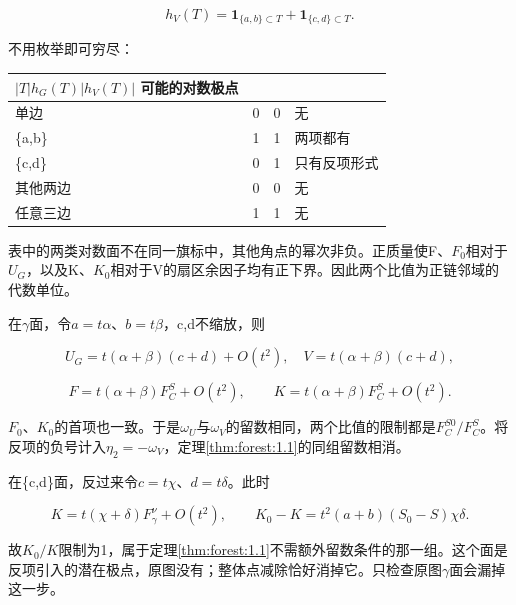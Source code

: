 \documentclass[11pt,a4paper,oneside]{ctexrep}
\theoremstyle{cnplain}
\theoremstyle{definition}
\theoremstyle{remark}
\begin{document}
\begin{equation}
h_V(T)=\mathbf1_{\{a,b\}\subset T}+\mathbf1_{\{c,d\}\subset T}.
\end{equation}

不用枚举即可穷尽：

{\def\LTcaptype{none} %
\begin{longtable}[]{@{}lrrl@{}}
\toprule\noalign{}
\(| T | h_G(T) | h_V(T) |\) 可能的对数极点 & & & \\
\midrule\noalign{}
\endhead
\bottomrule\noalign{}
\endlastfoot
单边 & 0 & 0 & 无 \\
\{a,b\} & 1 & 1 & 两项都有 \\
\{c,d\} & 0 & 1 & 只有反项形式 \\
其他两边 & 0 & 0 & 无 \\
任意三边 & 1 & 1 & 无 \\
\end{longtable}
}

表中的两类对数面不在同一旗标中，其他角点的幂次非负。正质量使F、\(F_0\)相对于\(U_G\)，以及K、\(K_0\)相对于V的扇区余因子均有正下界。因此两个比值为正链邻域的代数单位。

在\(\gamma \)面，令\(a=t\alpha \)、\(b=t\beta \)，c,d不缩放，则

\begin{equation}
U_G=t(\alpha+\beta)(c+d)+O(t^2),\quad
 V=t(\alpha+\beta)(c+d),
\end{equation}

\begin{equation}
F=t(\alpha+\beta)F_C^S+O(t^2),\qquad
 K=t(\alpha+\beta)F_C^S+O(t^2).                                 \label{eq:forest:15}
\end{equation}

\(F_0\)、\(K_0\)的首项也一致。于是\(\omega _U\)与\(\omega _V\)的留数相同，两个比值的限制都是\(F_C^{S0}/F_C^S\)。将反项的负号计入\(\eta _2=- \omega _V\)，定理\ref{thm:forest:1.1}的同组留数相消。

在\{c,d\}面，反过来令\(c=t\chi \)、\(d=t\delta \)。此时

\begin{equation}
K=t(\chi+\delta)F_\gamma^\nu+O(t^2),\qquad
 K_0-K=t^2(a+b)(S_0-S)\chi\delta.                              \label{eq:forest:16}
\end{equation}

故\(K_0/K\)限制为1，属于定理\ref{thm:forest:1.1}不需额外留数条件的那一组。这个面是反项引入的潜在极点，原图没有；整体点减除恰好消掉它。只检查原图\(\gamma \)面会漏掉这一步。
\end{document}
